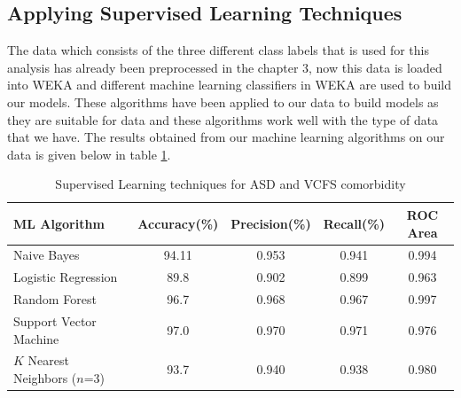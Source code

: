 \subsection{Applying Supervised Learning Techniques}

The data which consists of the three different class labels that is used for this analysis has already been preprocessed in the chapter 3, now this data is loaded into WEKA and different machine learning classifiers in WEKA are used to build our models. These algorithms have been applied to our data to build models as they are suitable for data and these algorithms work well with the type of data that we have. The results obtained from our machine learning algorithms on our data is given below in table \ref{table:56}. 
\begin{table}[h]
\begin{center}
\begin{tabular}{|l|c|c|c|c|}
\hline
\textbf{ML Algorithm} & \textbf{Accuracy(\%)}&	\textbf{Precision(\%)}&	\textbf{Recall(\%)}&	\textbf{ROC Area}\\
\hline \hline
Naive Bayes	&94.11&	0.953&	0.941&	0.994\\
\hline
Logistic Regression&	89.8	&0.902&	0.899&	0.963\\
\hline
Random Forest&96.7 &	0.968 &	0.967	&0.997\\
\hline
Support Vector Machine&97.0	&0.970&	0.971&	0.976\\
\hline
$K$ Nearest Neighbors ($n$=3)&93.7&	0.940&	0.938&	0.980\\
\hline
\end{tabular}
\end{center}
\caption{Supervised Learning techniques for ASD and VCFS comorbidity}
\label{table:56}
\end{table}

